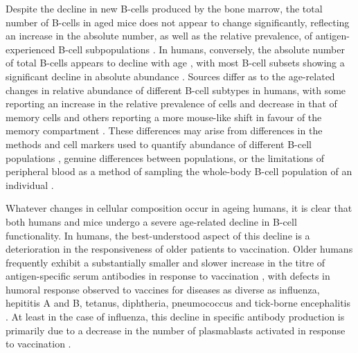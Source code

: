 Despite the decline in new \naive B-cells produced by the bone marrow, the total number of B-cells in aged mice does not appear to change significantly, reflecting an increase in the absolute number, as well as the relative prevalence, of antigen-experienced B-cell subpopulations \parencite{ademokun2010ageing}. In humans, conversely, the absolute number of total B-cells appears to decline with age \parencite{ademokun2010ageing,montecino2013immunosenescence,aberle2013mechanistic}, with most B-cell subsets showing a significant decline in absolute abundance \parencite{frasca2011age}. Sources differ as to the age-related changes in relative abundance of different B-cell subtypes in humans, with some reporting an increase in the relative prevalence of \naive cells and decrease in that of memory cells \parencite{frasca2011age,blomberg2013age} and others reporting a more mouse-like shift in favour of the memory compartment \parencite{ademokun2010ageing}. These differences may arise from differences in the methods and cell markers used to quantify abundance of different B-cell populations \parencite{ademokun2010ageing}, genuine differences between populations, or the limitations of peripheral blood as a method of sampling the whole-body B-cell population of an individual \parencite{siegrist2009extremes}.

Whatever changes in cellular composition occur in ageing humans, it is clear that both humans and mice undergo a severe age-related decline in B-cell functionality. In humans, the best-understood aspect of this decline is a deterioration in the responsiveness of older patients to vaccination. Older humans frequently exhibit a substantially smaller \parencite{sambhara2009vaccination} and slower \parencite{kogut2012bcells} increase in the titre of antigen-specific serum antibodies in response to vaccination \parencite{sasaki2011limited,aberle2013mechanistic,ademokun2010ageing}, with defects in humoral response observed to vaccines for diseases as diverse as influenza, hepititis A and B, tetanus, diphtheria, pneumococcus and tick-borne encephalitis \parencite{dunnwalters2010bcellageing}. At least in the case of influenza, this decline in specific antibody production is primarily due to a decrease in the number of plasmablasts activated in response to vaccination \parencite{montecino2013immunosenescence,aberle2013mechanistic,sasaki2011limited}.

